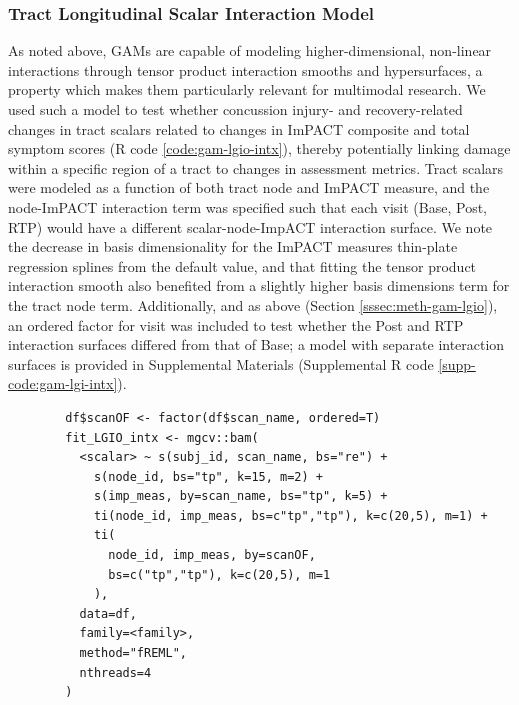 \documentclass[12pt]{article}
\begin{document}
\subsubsection{Tract Longitudinal Scalar Interaction Model}
\label{sssec:meth-gam-lgio-intx}
As noted above, GAMs are capable of modeling higher-dimensional, non-linear interactions through tensor product interaction smooths and hypersurfaces, a property which makes them particularly relevant for multimodal research. We used such a model to test whether concussion injury- and recovery-related changes in tract scalars related to changes in ImPACT composite and total symptom scores (R code \ref{code:gam-lgio-intx}), thereby potentially linking damage within a specific region of a tract to changes in assessment metrics. Tract scalars were modeled as a function of both tract node and ImPACT measure, and the node-ImPACT interaction term was specified such that each visit (Base, Post, RTP) would have a different scalar-node-ImpACT interaction surface. We note the decrease in basis dimensionality for the ImPACT measures thin-plate regression splines from the default value, and that fitting the tensor product interaction smooth also benefited from a slightly higher basis dimensions term for the tract node term. Additionally, and as above (Section \ref{sssec:meth-gam-lgio}), an ordered factor for visit was included to test whether the Post and RTP interaction surfaces differed from that of Base; a model with separate interaction surfaces is provided in Supplemental Materials (Supplemental R code \ref{supp-code:gam-lgi-intx}).

\begin{equ}[H]
	\begin{lstlisting}
		df$scanOF <- factor(df$scan_name, ordered=T)
		fit_LGIO_intx <- mgcv::bam(
		  <scalar> ~ s(subj_id, scan_name, bs="re") +
		    s(node_id, bs="tp", k=15, m=2) +
		    s(imp_meas, by=scan_name, bs="tp", k=5) +
		    ti(node_id, imp_meas, bs=c"tp","tp"), k=c(20,5), m=1) +
		    ti(
		      node_id, imp_meas, by=scanOF,
		      bs=c("tp","tp"), k=c(20,5), m=1
		    ),
		  data=df,
		  family=<family>,
		  method="fREML",
		  nthreads=4
		)
	\end{lstlisting}
	\caption{Tract scalars are modeled as a function of separate 1D node and ImPACT smooths as well as a 2D tensor product interaction surface, with ordered factors used to compare Post and RTP surfaces to Base. \lstinline{imp_meas} = ImPACT composite or total symptom measure.}
	\label{code:gam-lgio-intx}
\end{equ}
\end{document}
